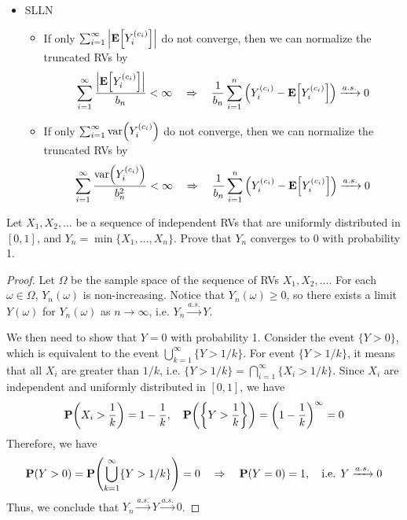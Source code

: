 \begin{remark}
\begin{itemize}
\begin{equation}
        \end{equation}
        \item SLLN \begin{itemize}
            \item If only $\sum_{i=1}^{\infty} \abs{\mathbf{E}\qty[Y_i^{(c_i)}]}$ do not converge, then we can normalize the truncated RVs by
            \begin{equation}
                \sum_{i=1}^{\infty} \frac{\abs{\mathbf{E}\qty[Y_i^{(c_i)}]}}{b_n} < \infty \quad\Rightarrow\quad \frac{1}{b_n} \sum_{i=1}^{n} \qty(Y_i^{(c_i)} - \mathbf{E}\qty[Y_i^{(c_i)}]) \xrightarrow{a.s.} 0
            \end{equation}
            \item If only $\sum_{i=1}^{\infty} \mathrm{var}\qty(Y_i^{(c_i)})$ do not converge, then we can normalize the truncated RVs by
            \begin{equation}
                \sum_{i=1}^{\infty} \frac{\mathrm{var}\qty(Y_i^{(c_i)})}{b_n^2} < \infty \quad\Rightarrow\quad \frac{1}{b_n} \sum_{i=1}^{n} \qty(Y_i^{(c_i)} - \mathbf{E}\qty[Y_i^{(c_i)}]) \xrightarrow{a.s.} 0
            \end{equation}
        \end{itemize}
    \end{itemize}
\end{remark}

\begin{example}
    Let $X_1, X_2, \ldots$ be a sequence of independent RVs that are uniformly distributed in $[0, 1]$, and $Y_n = \min\{X_1, \ldots, X_n\}$. Prove that $Y_n$ converges to 0 with probability 1.
\end{example}
\begin{proof}
    \label{ex:convergence-minimum}
    Let $\Omega$ be the sample space of the sequence of RVs $X_1, X_2, \ldots$. For each $\omega \in \Omega$, $Y_n(\omega)$ is non-increasing. Notice that $Y_n(\omega) \geq 0$, so there exists a limit $Y(\omega)$ for $Y_n(\omega)$ as $n \to \infty$, i.e. $Y_n \xrightarrow{a.s.} Y$.

    We then need to show that $Y = 0$ with probability 1. Consider the event $\{Y > 0\}$, which is equivalent to the event $\bigcup_{k=1}^{\infty} \{Y > 1/k\}$. For event $\{Y > 1/k\}$, it means that all $X_i$ are greater than $1/k$, i.e. $\{Y > 1/k\} = \bigcap_{i=1}^{\infty} \{X_i > 1/k\}$. Since $X_i$ are independent and uniformly distributed in $[0, 1]$, we have
    \begin{equation}
        \mathbf{P}\qty(X_i > \frac{1}{k}) = 1 - \frac{1}{k}, \quad \mathbf{P}\qty(\qty{Y > \frac{1}{k}}) = \qty(1 - \frac{1}{k})^\infty = 0
    \end{equation}
    Therefore, we have
    \begin{equation}
        \mathbf{P}\qty(Y > 0) = \mathbf{P}\qty(\bigcup_{k=1}^{\infty} \{Y > 1/k\}) = 0 \quad\Rightarrow\quad \mathbf{P}\qty(Y = 0) = 1, \quad\text{i.e. } Y \xrightarrow{a.s.} 0
    \end{equation}
    Thus, we conclude that $Y_n \xrightarrow{a.s.} Y \xrightarrow{a.s.} 0$.
\end{proof}
